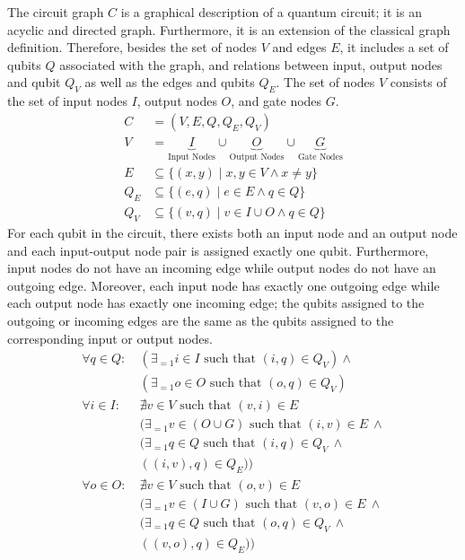 The circuit graph $C$ is a graphical description of a quantum circuit; it is an acyclic and directed graph. Furthermore, it is an extension of the classical graph definition. Therefore, besides the set of nodes $V$ and edges $E$, it includes a set of qubits $Q$ associated with the graph, and relations between input, output nodes and qubit $Q_V$ as well as the edges and qubits $Q_E$. The set of nodes $V$ consists of the set of input nodes $I$, output nodes $O$, and gate nodes $G$.
\begin{align*}
    C &= (V, E, Q, Q_E, Q_V)\\
    V &= \underbrace{I}_{\text{Input Nodes}} \cup \underbrace{O}_{\text{Output Nodes}} \cup \underbrace{G}_{\text{Gate Nodes}}\\
    E &\subseteq \{ (x, y) \mid x,y \in V \land x \neq y \}\\
    Q_E &\subseteq \{ (e, q) \mid e \in E \land q \in Q \}\\
    Q_V &\subseteq \{ (v, q) \mid v \in I \cup O \land q \in Q \}
\end{align*}
For each qubit in the circuit, there exists both an input node and an output node and each input-output node pair is assigned exactly one qubit.
Furthermore, input nodes do not have an incoming edge while output nodes do not have an outgoing edge. 
Moreover, each input node has exactly one outgoing edge while each output node has exactly one incoming edge; the qubits assigned to the outgoing or incoming edges are the same as the qubits assigned to the corresponding input or output nodes.  
\begin{align*}
    \forall q \in Q :\ & (\exists_{=1} i \in I \text{ such that } (i, q) \in Q_V) \land\\
                       & (\exists_{=1} o \in O \text{ such that } (o, q) \in Q_V) \\
    \forall i \in I :\ & \nexists v \in V \text{ such that } (v, i) \in E\\
                       & (\exists_{=1} v \in (O \cup G) \text{ such that } (i, v) \in E  \ \land\\
                       & (\exists_{=1} q \in Q \text{ such that } (i, q) \in Q_V \ \land \\
                       &  ((i, v), q) \in Q_E))\\
    \forall o \in O :\ & \nexists v \in V \text{ such that } (o, v) \in E\\
                       & (\exists_{=1} v \in (I \cup G) \text{ such that } (v, o) \in E \ \land\\
                       & (\exists_{=1} q \in Q \text{ such that } (o, q) \in Q_V \ \land \\
                       &  ((v, o), q) \in Q_E))
\end{align*}

